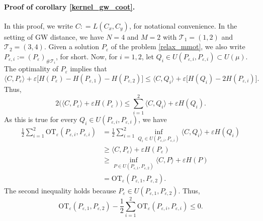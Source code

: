 \documentclass{article}
\begin{document}
\paragraph{Proof of corollary \ref{kernel_gw_coot}.} In this proof, we write $C: = L(C_x,C_y)$, for notational convenience. 
In the setting of GW distance, we have $N=4$ and $M = 2$ with $\mathcal T_1 = (1,2)$ and $\mathcal T_2 = (3,4)$. 
Given a solution $P_{\varepsilon}$ of the problem \ref{relax_mmot}, we also write 
$P_{\varepsilon, i} := (P_{\varepsilon})_{\# \mathcal T_i}$, for short. Now, for $i = 1,2$, 
let $Q_i \in U( P_{\varepsilon, i}, P_{\varepsilon, i}) \subset U(\mu)$. The optimality of $P_{\varepsilon}$ 
implies that
\begin{equation*}
    \langle C, P_{\varepsilon} \rangle + \varepsilon \big[ H(P_{\varepsilon}) - H(P_{\varepsilon, 1}) - 
    H(P_{\varepsilon, 2}) \big] \leq 
    \langle C, Q_i \rangle + \varepsilon \big[ H(Q_i) - 2 H(P_{\varepsilon, i}) \big].
\end{equation*}
Thus,
\begin{equation*}
    2 \big( \langle C, P_{\varepsilon} \rangle + \varepsilon H(P_{\varepsilon}) \big) \leq 
    \sum_{i=1}^2 \langle C, Q_i \rangle + \varepsilon H(Q_i).
\end{equation*}
As this is true for every $Q_i \in U(P_{\varepsilon, i}, P_{\varepsilon, i})$, we have
\begin{equation*}
    \begin{split}
        \frac{1}{2} \sum_{i=1}^2 
        \text{OT}_{\varepsilon}(P_{\varepsilon, i}, P_{\varepsilon, i})
        &= \frac{1}{2} \sum_{i=1}^2 \inf_{Q_i \in U(P_{\varepsilon, i}, P_{\varepsilon, i})} 
        \langle C, Q_i \rangle + \varepsilon H(Q_i) \\
        &\geq \langle C, P_{\varepsilon} \rangle + \varepsilon H(P_{\varepsilon}) \\
        &\geq \inf_{P \in U(P_{\varepsilon, 1}, P_{\varepsilon, 2})} 
        \langle C, P \rangle + \varepsilon H(P) \\
        &= \text{OT}_{\varepsilon}(P_{\varepsilon, 1}, P_{\varepsilon, 2}).
    \end{split}
\end{equation*}
The second inequality holds because $P_{\varepsilon} \in U(P_{\varepsilon, 1}, P_{\varepsilon, 2})$. Thus,
\begin{equation} \label{sinkhorn_div}
  \text{OT}_{\varepsilon}(P_{\varepsilon, 1}, P_{\varepsilon, 2}) - 
  \frac{1}{2} \sum_{i=1}^2 \text{OT}_{\varepsilon}(P_{\varepsilon, i}, P_{\varepsilon, i}) \leq 0.
\end{equation}
\end{document}
